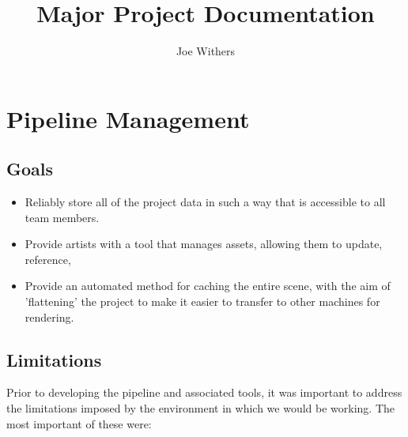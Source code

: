 \documentclass[11pt]{article}
\title{\textbf{Major Project Documentation}}
\author{Joe Withers}
\date{}
\begin{document}
\maketitle

\tableofcontents
\newpage

\section{Pipeline Management}

\subsection{Goals}

\begin{itemize}

\item Reliably store all of the project data in such a way that is accessible to all team members.

\item Provide artists with a tool that manages assets, allowing them to update, reference,






\item Provide an automated method for caching the entire scene, with the aim of 'flattening' the project to make it easier to transfer to other machines for rendering.

\end{itemize}

\subsection{Limitations}

Prior to developing the pipeline and associated tools, it was important to address the limitations imposed by the environment in which we would be working. The most important of these were:
\end{document}
